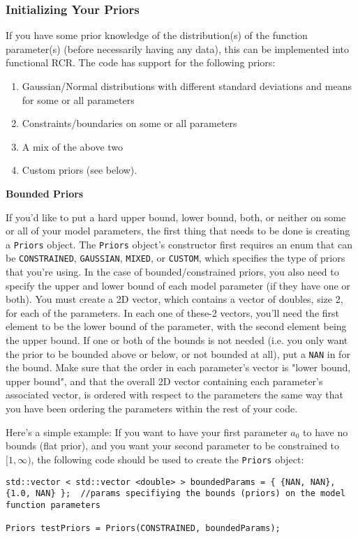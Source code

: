 \documentclass[12pt]{article}
\newcommand{\li}{\lstinline}
\begin{document}
\subsubsection{Initializing Your Priors}
\par If you have some prior knowledge of the distribution(s) of the function parameter(s) (before necessarily having any data), this can be implemented into functional RCR. The code has support for the following priors:
\begin{enumerate}
	\item Gaussian/Normal distributions with different standard deviations and means for some or all parameters
	\item Constraints/boundaries on some or all parameters
	\item A mix of the above two
	\item Custom priors (see below).
\end{enumerate} 
\textbf{Bounded Priors}
\par If you'd like to put a hard upper bound, lower bound, both, or neither on some or all of your model parameters, the first thing that needs to be done is creating a \lstinline{Priors} object. The \li{Priors} object's constructor first requires an enum that can be \li{CONSTRAINED}, \li{GAUSSIAN}, \li{MIXED}, or \li{CUSTOM}, which specifies the type of priors that you're using. In the case of bounded/constrained priors, you also need to specify the upper and lower bound of each model parameter (if they have one or both). You must create a 2D vector, which contains a vector of doubles, size 2, for each of the parameters. In each one of these-2 vectors, you'll need the first element to be the lower bound of the parameter, with the second element being the upper bound. If one or both of the bounds is not needed (i.e. you only want the prior to be bounded above or below, or not bounded at all), put a \li{NAN} in for the bound. Make sure that the order in each parameter's vector is "lower bound, upper bound", and that the overall 2D vector containing each parameter's associated vector, is ordered with respect to the parameters the same way that you have been ordering the parameters within the rest of your code.
\par Here's a simple example: If you want to have your first parameter $a_0$ to have no bounds (flat prior), and you want your second parameter to be constrained to $[1,\infty)$, the following code should be used to create the \li{Priors} object:
\begin{lstlisting}
std::vector < std::vector <double> > boundedParams = { {NAN, NAN}, {1.0, NAN} };  //params specifiying the bounds (priors) on the model function parameters

Priors testPriors = Priors(CONSTRAINED, boundedParams);
\end{lstlisting}
\end{document}

